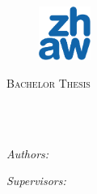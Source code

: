 \documentclass[
11pt, %
english, %
singlespacing, %
headsepline, %
]{MastersDoctoralThesis} %
\begin{document}
\clearpage


\begin{titlepage}
\begin{center}

\begin{figure}
\centering
\includegraphics[width=0.15\textwidth]{thesis/Figures/ZHAW_Logo.png} %
\end{figure}

\vspace*{.06\textheight}
{\scshape\LARGE \univname\par}\vspace{1.5cm} %
\textsc{\Large Bachelor Thesis}\\[0.5cm] %

\HRule \\[0.4cm] %
{\huge \bfseries \ttitle\par}\vspace{0.4cm} %
\HRule \\[1.5cm] %
 
\begin{minipage}[t]{0.4\textwidth}
\begin{flushleft} \large
\emph{Authors:}\\
\authorname %
\end{flushleft}
\end{minipage}
\begin{minipage}[t]{0.4\textwidth}
\begin{flushright} \large
\emph{Supervisors:} \\
\supname %
\end{flushright}
\end{minipage}\\[3cm]
 
\vfill


\end{center}
\end{titlepage}
\end{document}
